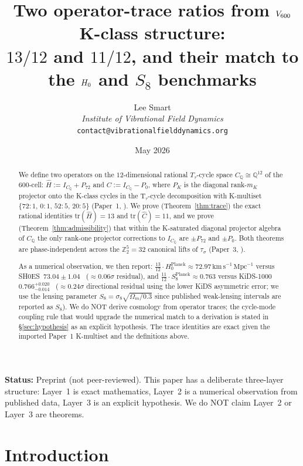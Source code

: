 \documentclass[11pt]{article}
\title{Two operator-trace ratios from $V_{600}$ K-class structure:\\
       $13/12$ and $11/12$, and their match to the
       $\Hzero$ and $S_8$ benchmarks}
\author{%
  Lee Smart \\[3pt]
  \textit{Institute of Vibrational Field Dynamics} \\[2pt]
  \texttt{contact@vibrationalfielddynamics.org}}
\date{May 2026}
\newcommand{\CQ}{C_{\mathbb{Q}}}
\newcommand{\IC}{I_{\CQ}}
\newcommand{\PK}[1]{P_{#1}}
\newcommand{\Hop}{\hat H}
\newcommand{\Cop}{\hat C}
\newcommand{\Ttau}{T_{\tau}}
\newcommand{\Hzero}{H_0}
\newcommand{\sigeight}{\sigma_8}
\begin{document}
\maketitle

\noindent\textbf{Status:} Preprint (not peer-reviewed).
This paper has a deliberate three-layer structure: Layer~1 is exact
mathematics, Layer~2 is a numerical observation from published data,
Layer~3 is an explicit hypothesis. We do NOT claim Layer~2 or Layer~3
are theorems.

\begin{abstract}
We define two operators on the $12$-dimensional rational
$\Ttau$-cycle space $\CQ \cong \mathbb{Q}^{12}$ of the $600$-cell:
$\Hop := \IC + \PK{72}$ and $\Cop := \IC - \PK{0}$, where $\PK{K}$ is
the diagonal rank-$m_K$ projector onto the K-class cycles in the
T$_\tau$-cycle decomposition with K-multiset
$\{72{:}1,\,0{:}1,\,52{:}5,\,20{:}5\}$
(Paper~1, \citealp{V600Paper1}). We prove (Theorem~\ref{thm:trace})
the exact rational identities $\mathrm{tr}(\Hop) = 13$ and
$\mathrm{tr}(\Cop) = 11$, and we prove
(Theorem~\ref{thm:admissibility}) that within the K-saturated
diagonal projector algebra of $\CQ$ the only rank-one projector corrections to
$\IC$ are $\pm\PK{72}$ and $\pm\PK{0}$. Both theorems are
phase-independent across the $\mathbb{Z}_2^5 = 32$ canonical lifts of
$\tau_\sigma$ (Paper~3, \citealp{V600Paper3}).

As a numerical observation, we then report:
$\frac{13}{12} \cdot \Hzero^{\mathrm{Planck}} \approx 72.97\,
\mathrm{km\,s^{-1}\,Mpc^{-1}}$ versus
SH0ES~$73.04 \pm 1.04$~\citep{Riess2022SH0ES}
($\approx 0.06\sigma$ residual), and
$\frac{11}{12} \cdot S_8^{\mathrm{Planck}} \approx 0.763$ versus
KiDS-1000~$0.766^{+0.020}_{-0.014}$~\citep{Heymans2021KiDS}
($\approx 0.24\sigma$ directional residual using the lower KiDS
asymmetric error; we use the lensing parameter
$S_8 = \sigeight \sqrt{\Omega_m / 0.3}$ since published weak-lensing
intervals are reported as $S_8$).
We do NOT derive cosmology from operator traces; the cycle-mode
coupling rule that would upgrade the numerical match to a derivation
is stated in \S\ref{sec:hypothesis} as an explicit hypothesis. The
trace identities are exact given the imported Paper~1 K-multiset and
the definitions above.
\end{abstract}

\section{Introduction}\label{sec:intro}
\end{document}
